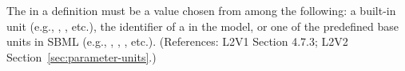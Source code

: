 The  in a \Parameter definition must be a value chosen from
among the following: a built-in unit (e.g., , ,
etc.), the identifier of a \UnitDefinition in the model, or one of the
predefined base units in SBML (e.g., , , ,
etc.).  (References: L2V1 Section 4.7.3; L2V2
Section~\ref{sec:parameter-units}.)
